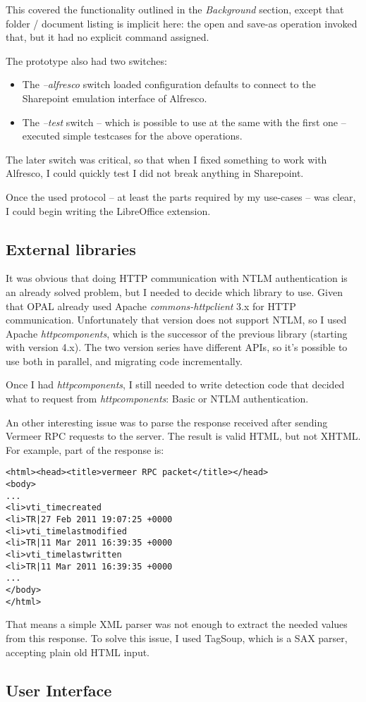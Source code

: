 This covered the functionality outlined in the \emph{Background} section,
except that folder / document listing is implicit here: the open and save-as
operation invoked that, but it had no explicit command assigned.

The prototype also had two switches:

\begin{itemize}
\item The \emph{--alfresco} switch loaded configuration defaults to connect to the Sharepoint emulation interface of Alfresco.
\item The \emph{--test} switch -- which is possible to use at the same with the first one -- executed simple testcases for the above operations.
\end{itemize}

The later switch was critical, so that when I fixed something to work with
Alfresco, I could quickly test I did not break anything in Sharepoint.

Once the used protocol -- at least the parts required by my use-cases -- was
clear, I could begin writing the LibreOffice extension.

\subsection{External libraries}

It was obvious that doing HTTP communication with NTLM authentication is an
already solved problem, but I needed to decide which library to use. Given that
OPAL already used Apache \emph{commons-httpclient}\cite{httpclient} 3.x for
HTTP communication. Unfortunately that version does not support NTLM, so I used
Apache \emph{httpcomponents}\cite{httpcomponents}, which is the successor of
the previous library (starting with version 4.x). The two version series have
different APIs, so it's possible to use both in parallel, and migrating code
incrementally.

Once I had \emph{httpcomponents}, I still needed to write detection code that
decided what to request from \emph{httpcomponents}: Basic or NTLM
authentication.

An other interesting issue was to parse the response received after sending
Vermeer RPC requests to the server. The result is valid HTML, but not XHTML.
For example, part of the response is:

\begin{lstlisting}
<html><head><title>vermeer RPC packet</title></head>
<body>
...
<li>vti_timecreated
<li>TR|27 Feb 2011 19:07:25 +0000
<li>vti_timelastmodified
<li>TR|11 Mar 2011 16:39:35 +0000
<li>vti_timelastwritten
<li>TR|11 Mar 2011 16:39:35 +0000
...
</body>
</html>\end{lstlisting}

That means a simple XML parser was not enough to extract the needed values from
this response. To solve this issue, I used TagSoup\cite{tagsoup}, which is a
SAX parser, accepting plain old HTML input.

\subsection{User Interface}
